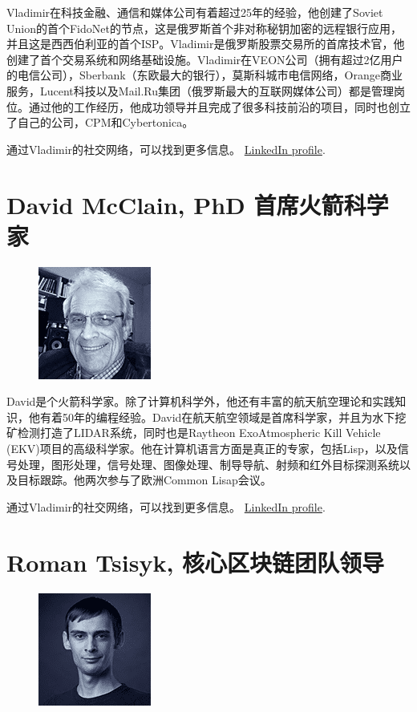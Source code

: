 \documentclass[8pt,fleqn,openany]{book}
\begin{document}
\begin{CJK*}{UTF8}{gbsn}
{Vladimir在科技金融、通信和媒体公司有着超过25年的经验，他创建了Soviet Union的首个FidoNet的节点，这是俄罗斯首个非对称秘钥加密的远程银行应用，并且这是西西伯利亚的首个ISP。Vladimir是俄罗斯股票交易所的首席技术官，他创建了首个交易系统和网络基础设施。Vladimir在VEON公司（拥有超过2亿用户的电信公司），Sberbank（东欧最大的银行），莫斯科城市电信网络，Orange商业服务，Lucent科技以及Mail.Ru集团（俄罗斯最大的互联网媒体公司）都是管理岗位。通过他的工作经历，他成功领导并且完成了很多科技前沿的项目，同时也创立了自己的公司，CPM和Cybertonica。

通过Vladimir的社交网络，可以找到更多信息。 \href{https://linkedin.com/in/vlebedev}{LinkedIn profile}.
}

\section{David McClain, PhD 首席火箭科学家}

{
\setlength\intextsep{0pt}
\begin{figure}
	\includegraphics{images/team/team-3.png}
\end{figure}

David是个火箭科学家。除了计算机科学外，他还有丰富的航天航空理论和实践知识，他有着50年的编程经验。David在航天航空领域是首席科学家，并且为水下挖矿检测打造了LIDAR系统，同时也是Raytheon ExoAtmospheric Kill Vehicle (EKV)项目的高级科学家。他在计算机语言方面是真正的专家，包括Lisp，以及信号处理，图形处理，信号处理、图像处理、制导导航、射频和红外目标探测系统以及目标跟踪。他两次参与了欧洲Common Lisap会议。

通过Vladimir的社交网络，可以找到更多信息。 \href{https://www.linkedin.com/in/david-mcclain-685669155/}{LinkedIn profile}.

\section{Roman Tsisyk, 核心区块链团队领导}

{
\setlength\intextsep{0pt}
\begin{figure}
	\includegraphics{images/team/team-4.png}
\end{figure}

}}
\end{CJK*}
\end{document}

